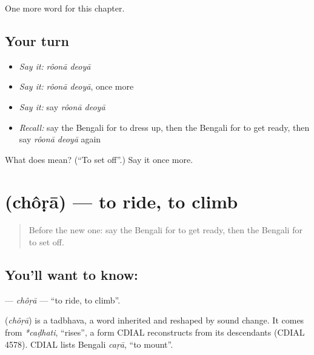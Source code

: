 \begin{grammarlens}[title={What you've built}]
One more word for this chapter.
\end{grammarlens}

\subsection*{Your turn}
\begin{itemize}
\raggedright
  \item \emph{Say it:} \emph{rôonā deoyā}
  \item \emph{Say it:} \emph{rôonā deoyā}, once more
  \item \emph{Say it:} say \emph{rôonā deoyā}
  \item \emph{Recall:} say the Bengali for to dress up, then the Bengali for to get ready, then say \emph{rôonā deoyā} again
\end{itemize}

\begin{tcolorbox}[breakable,colback=teal!4,colframe=teal!35!black,title={Before you move on}]
What does   mean? (\textquotedblleft{}To set off\textquotedblright{}.) Say it once more.
\end{tcolorbox}
\section[\texorpdfstring{\bn{চড়া} (chôṛā)}{চড়া (chôṛā)}]{ (chôṛā) — to ride, to climb}

\label{lesson:BN-C213-chora}



\begin{quote}
Before the new one: say the Bengali for to get ready, then the Bengali for to set off.
\end{quote}

\subsection*{You'll want to know: }
\textbf{} — \emph{chôṛā} — \textquotedblleft{}to ride, to climb\textquotedblright{}.

\begin{cousinweb}
\textbf{} (\emph{chôṛā}) is a tadbhava, a word inherited and reshaped by sound change. It comes from \emph{*caḍhati}, \textquotedblleft{}rises\textquotedblright{}, a form CDIAL reconstructs from its descendants (CDIAL 4578). CDIAL lists Bengali \emph{caṛā}, \textquotedblleft{}to mount\textquotedblright{}.
\end{cousinweb}

